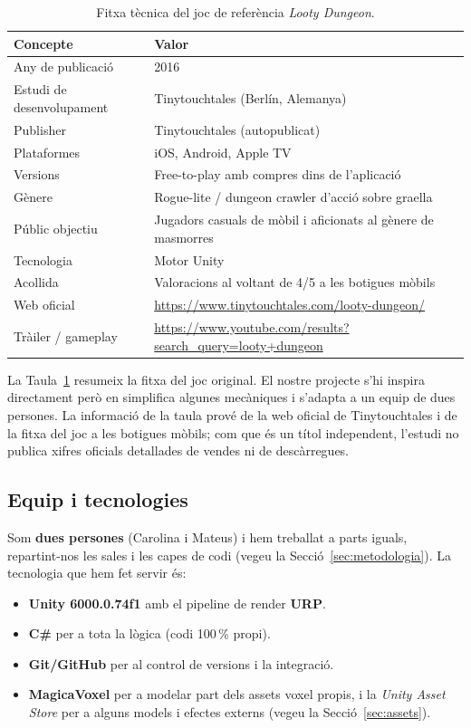\documentclass[11pt,a4paper]{article}
\begin{document}
\begin{table}[H]
\centering
\caption{Fitxa tècnica del joc de referència \textit{Looty Dungeon}.}
\label{tab:looty}
\begin{tabularx}{\linewidth}{lX}
\toprule
\textbf{Concepte} & \textbf{Valor} \\
\midrule
Any de publicació & 2016 \\
Estudi de desenvolupament & Tinytouchtales (Berlín, Alemanya) \\
Publisher & Tinytouchtales (autopublicat) \\
Plataformes & iOS, Android, Apple TV \\
Versions & Free-to-play amb compres dins de l'aplicació \\
Gènere & Rogue-lite / dungeon crawler d'acció sobre graella \\
Públic objectiu & Jugadors casuals de mòbil i aficionats al gènere de masmorres \\
Tecnologia & Motor Unity \\
Acollida & Valoracions al voltant de 4/5 a les botigues mòbils \\
Web oficial & \url{https://www.tinytouchtales.com/looty-dungeon/} \\
Tràiler / gameplay & \url{https://www.youtube.com/results?search_query=looty+dungeon} \\
\bottomrule
\end{tabularx}
\end{table}

La Taula~\ref{tab:looty} resumeix la fitxa del joc original. El nostre projecte
s'hi inspira directament però en simplifica algunes mecàniques i s'adapta a un
equip de dues persones. La informació de la taula prové de la web oficial de
Tinytouchtales i de la fitxa del joc a les botigues mòbils; com que és un títol
independent, l'estudi no publica xifres oficials detallades de vendes ni de
descàrregues.

\subsection{Equip i tecnologies}

Som \textbf{dues persones} (Carolina i Mateus) i hem treballat a parts iguals,
repartint-nos les sales i les capes de codi (vegeu la
Secció~\ref{sec:metodologia}). La tecnologia que hem fet servir és:

\begin{itemize}[noitemsep]
    \item \textbf{Unity 6000.0.74f1} amb el pipeline de render \textbf{URP}.
    \item \textbf{C\#} per a tota la lògica (codi 100\,\% propi).
    \item \textbf{Git/GitHub} per al control de versions i la integració.
    \item \textbf{MagicaVoxel} per a modelar part dels assets voxel propis, i la
    \textit{Unity Asset Store} per a alguns models i efectes externs (vegeu la
    Secció~\ref{sec:assets}).
\end{itemize}
\end{document}
